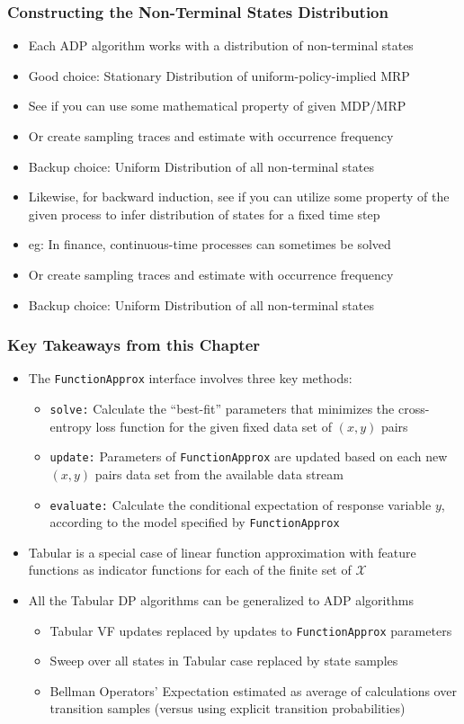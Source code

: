 \documentclass[handout]{beamer}
\begin{document}
\begin{frame}
\frametitle{Constructing the Non-Terminal States Distribution}
\pause
\begin{itemize}[<+->]
\item Each ADP algorithm works with a distribution of non-terminal states
\item Good choice: Stationary Distribution of uniform-policy-implied MRP
\item See if you can use some mathematical property of given MDP/MRP
\item Or create sampling traces and estimate with occurrence frequency
\item Backup choice: Uniform Distribution of all non-terminal states
\item Likewise, for backward induction, see if you can utilize some property of the given process to infer distribution of states for a fixed time step
\item eg: In finance, continuous-time processes can sometimes be solved
\item Or create sampling traces and estimate with occurrence frequency
\item Backup choice: Uniform Distribution of all non-terminal states
\end{itemize}
\end{frame}


\begin{frame}
\frametitle{Key Takeaways from this Chapter}
\pause
\begin{itemize}[<+->]
\item The \lstinline{FunctionApprox} interface involves three key methods:
\begin{itemize}
\item \lstinline{solve:} Calculate the ``best-fit'' parameters that minimizes the cross-entropy loss function for the given fixed data set of $(x,y)$ pairs
\item \lstinline{update:} Parameters of \lstinline{FunctionApprox} are updated based on each new $(x,y)$ pairs data set from the available data stream
\item \lstinline{evaluate:}  Calculate the conditional expectation of response variable $y$, according to the model specified by \lstinline{FunctionApprox}
\end{itemize}
\item Tabular is a special case of linear function approximation with feature functions as indicator functions for each of the finite set of $\mathcal{X}$
\item All the Tabular DP algorithms can be generalized to ADP algorithms
\begin{itemize}
\item Tabular VF updates replaced by updates to \lstinline{FunctionApprox} parameters
\item Sweep over all states in Tabular case replaced by state samples
\item Bellman Operators' Expectation estimated as average of calculations over transition samples (versus using explicit transition probabilities)
\end{itemize}
\end{itemize}
\end{frame}
\end{document}
